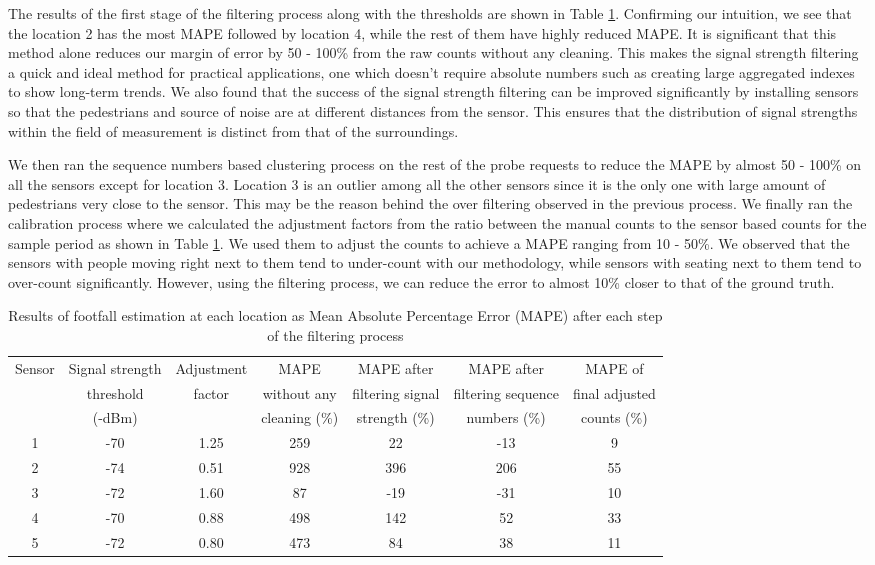 The results of the first stage of the filtering process along with the
thresholds are shown in Table \ref{errors_table}.  Confirming our intuition, we
see that the location 2 has the most MAPE followed by location 4, while the rest
of them have highly reduced MAPE.  It is significant that this method alone
reduces our margin of error by 50 - 100\% from the raw counts without any
cleaning.  This makes the signal strength filtering a quick and ideal method for
practical applications, one which doesn't require absolute numbers such as
creating large aggregated indexes to show long-term trends.  We also found that
the success of the signal strength filtering can be improved significantly by
installing sensors so that the pedestrians and source of noise are at different
distances from the sensor. This ensures that the distribution of signal
strengths within the field of measurement is distinct from that of the
surroundings.

We then ran the sequence numbers based clustering process on the rest of the
probe requests to reduce the MAPE by almost 50 - 100\% on all the sensors except
for location 3.  Location 3 is an outlier among all the other sensors since it
is the only one with large amount of pedestrians very close to the sensor.  This
may be the reason behind the over filtering observed in the previous process.
We finally ran the calibration process where we calculated the adjustment
factors from the ratio between the manual counts to the sensor based counts for
the sample period as shown in Table \ref{errors_table}.  We used them to adjust
the counts to achieve a MAPE ranging from 10 - 50\%. We observed that the
sensors with people moving right next to them tend to under-count with our
methodology, while sensors with seating next to them tend to over-count
significantly. However, using the filtering process, we can reduce the error to
almost 10\% closer to that of the ground truth.

\begin{table}
	\caption{Results of footfall estimation at each location as Mean Absolute Percentage Error (MAPE) after each step of the filtering process}
	{\begin{tabular}{ccccccc} 
		\toprule
			Sensor & Signal strength & Adjustment & MAPE & MAPE after & MAPE after & MAPE of\\
			& threshold & factor & without any & filtering signal & filtering sequence & final adjusted\\
			& (-dBm) & &  cleaning (\%) & strength (\%) & numbers (\%) & counts (\%)\\
		 \midrule
			1 & -70 & 1.25 & 259 &  22 & -13 &  9 \\
			2 & -74 & 0.51 & 928 & 396 & 206 & 55 \\
			3 & -72 & 1.60 &  87 & -19 & -31 & 10 \\
			4 & -70 & 0.88 & 498 & 142 &  52 & 33 \\
			5 & -72 & 0.80 & 473 &  84 &  38 & 11 \\
		 \bottomrule
	\end{tabular}}
	\label{errors_table}
\end{table}

